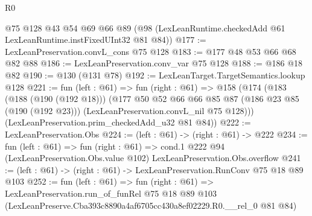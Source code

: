 \begin{lexlean}{R0}
\begin{coremodule}
    @75
    @128
    @43
    @54
    @69
    @66
    @89
    (@98 (LexLeanRuntime.checkedAdd @61 LexLeanRuntime.instFixedUInt32 @81 @84))
@177 := LexLeanPreservation.convL_cons @75 @128
@183 := @177 @48 @53 @66 @68 @82 @88
@186 := LexLeanPreservation.conv_var @75 @128
@188 := @186 @18 @82
@190 := @130 (@131 @78)
@192 := LexLeanTarget.TargetSemantics.lookup @128
@221 := fun (left : @61) =>
  fun (right : @61) =>
  @158
    (@174
      (@183
        (@188 (@190 (@192 @18)))
        (@177
          @50
          @52
          @66
          @66
          @85
          @87
          (@186 @23 @85 (@190 (@192 @23)))
          (LexLeanPreservation.convL_nil @75 @128)))
      (LexLeanPreservation.prim_checkedAdd_u32 @81 @84))
@222 := LexLeanPreservation.Obs
@224 := (left : @61) -> (right : @61) -> @222
@234 := fun (left : @61) =>
  fun (right : @61) =>
  cond.{1} @222 @94 (LexLeanPreservation.Obs.value @102) LexLeanPreservation.Obs.overflow
@241 := (left : @61) -> (right : @61) -> LexLeanPreservation.RunConv @75 @18 @89 @103
@252 := fun (left : @61) =>
  fun (right : @61) =>
  LexLeanPreservation.run_of_funRel
    @75
    @18
    @89
    @103
    (LexLeanPreserve.Cba393c8890a4af6705cc430a8ef02229.R0.__rel_0 @81 @84)
\end{coremodule}
\end{lexlean}
